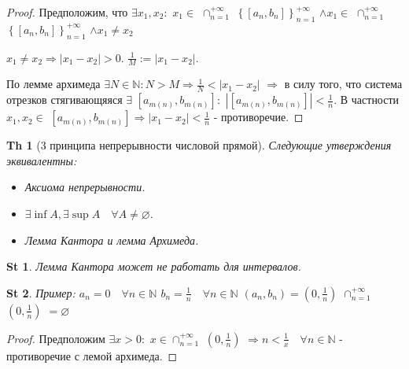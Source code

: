 \documentclass[a5paper, 10pt]{article}
\theoremstyle{plain}
\newtheorem*{theorem}{Th}
\newtheorem*{statement}{St}
\newcommand{\N}{\mathbb N}
\newcommand{\Rarrow}{\Rightarrow}
\begin{document}
    \begin{proof}
    Предположим, что $ \exists x_1, x_2: $
    $ x_1 \in $
    $ \cap_{n=1}^{+\infty} $
    $ \left\{ \left[ a_n, b_n \right] \right\}_{n=1}^{+\infty} $
    $ \land x_1 \in $
    $ \cap_{n=1}^{+\infty} $
    $ \left\{ \left[ a_n, b_n \right] \right\}_{n=1}^{+\infty} $
    $ \land x_1 \neq x_2 $

    \noindent
    $ x_1 \neq x_2 \Rarrow |x_1 - x_2| > 0 $.
    \newline
    $ \frac{1}{M} := |x_1 - x_2| $.

    По лемме архимеда
    $ \exists N \in \N: N > M \Rarrow \frac{1}{N} < |x_1 - x_2| $
    $ \Rarrow $ в силу того, что система отрезков стягивающяяся
    $ \exists $
    $ \left[ a_{m(n)}, b_{m(n)} \right]: $
    $ \left| \left[ a_{m(n)}, b_{m(n)} \right] \right| < \frac{1}{n} $.
    В частности $ x_1, x_2 \in $
    $ \left[ a_{m(n)}, b_{m(n)} \right] \Rarrow \left| x_1 - x_2 \right| < \frac{1}{n}$
    - противоречие.
    \end{proof}

    \begin{theorem}[3 принципа непрерывности числовой прямой]
    Следующие утверждения эквивалентны:

    \begin{itemize}
        \item Аксиома непрерывности.
        \item $ \exists \inf A, \exists \sup A \quad \forall A \neq \varnothing $.
        \item Лемма Кантора и лемма Архимеда.
    \end{itemize}
    \end{theorem}

    \begin{statement}
    Лемма Кантора может не работать для интервалов.
    \end{statement}

    \begin{statement}
    Пример: \newline
        $ a_n = 0 \quad \forall n \in \N $ \newline
        $ b_n = \frac{1}{n} \quad \forall n \in \N $ \newline
        $ (a_n, b_n) = \left( 0, \frac{1}{n} \right) $ \newline
        $ \cap_{n=1}^{+\infty} $
        $ \left( 0, \frac{1}{n} \right) $
        $ = \varnothing $
    \end{statement}

    \begin{proof}
    Предположим $ \exists x > 0: $ \newline
        $ x \in \cap_{n=1}^{+\infty} $
        $ \left( 0, \frac{1}{n} \right) $
        $ \Rarrow n < \frac{1}{x} \quad \forall n \in \N $
        - противоречие с лемой архимеда.
    \end{proof}
\end{document}

